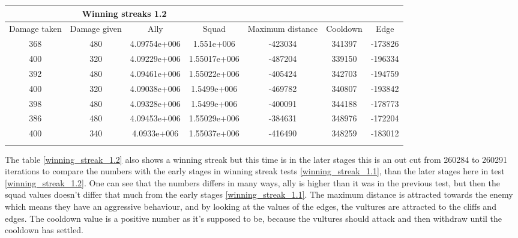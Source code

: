 \begin{centering}
 \begin{tabular}{|c||c|c|c|c|c|c|}
	\multicolumn{4}{c}{Winning streaks 1.2} \\
	\hline
	Damage taken & 				Damage given & 			Ally & 			Squad & 			Maximum distance & 			Cooldown & 				Edge \\
	\hline
	368& 								480& 					4.09754e+006&	1.551e+006&		-423034&							341397&				-173826\\
	400& 								320& 					4.09229e+006&	1.55017e+006&	-487204&							339150&				-196334\\
	392& 								480& 					4.09461e+006&	1.55022e+006&	-405424&							342703&				-194759\\
	400& 								320& 					4.09038e+006&	1.5499e+006&		-469782&							340807&				-193842\\
	398& 								480& 					4.09328e+006&	1.5499e+006&		-400091&							344188&				-178773\\
	386& 								480& 					4.09453e+006&	1.55029e+006&	-384631&							348976&				-172204\\
	400&		 							340&						4.0933e+006&		1.55037e+006&	-416490&							348259&				-183012\\

	\hline
	\label{winning_streak_1.2}
\end{tabular}
\end{centering}
The table \ref{winning_streak_1.2} also shows a winning streak but this time is in the later stages this is an out cut from 260284 to 260291 iterations to compare the numbers with the early stages in winning streak tests \ref{winning_streak_1.1}, than the later stages here in test \ref{winning_streak_1.2}. One can see that the numbers differs in many ways, ally is higher than it was in the previous test, but then the squad values doesn't differ that much from the early stages \ref{winning_streak_1.1}. The maximum distance is attracted towards the enemy which means they have an aggressive behaviour, and by looking at the values of the edges, the vultures are attracted to the cliffs and edges. The cooldown value is a positive number as it's supposed to be, because the vultures should attack and then withdraw until the cooldown has settled.

